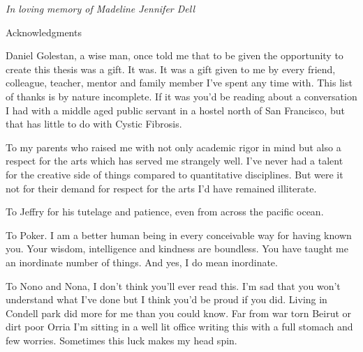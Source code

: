 \newpage


\thispagestyle{empty}


\begin{center}
	\vspace*{\fill}
\textit {In loving memory of Madeline Jennifer Dell} \\
	\vspace*{\fill}
\end{center}

\clearpage

\begin{center}
\begin{Large}
\begin{bfseries}
Acknowledgments
\end{bfseries}
\end{Large}
\end{center}
 Daniel Golestan, a wise man, once told me that to be given the opportunity to create this thesis was a gift. It was. It was a gift given to me by every friend, colleague, teacher, mentor and family member I've spent any time with. This list of thanks is by nature incomplete. If it was you'd be reading about a conversation I had with a middle aged public servant in a hostel north of San Francisco, but that has little to do with Cystic Fibrosis. 

To my parents who raised me with not only academic rigor in mind but also a respect for the arts which has served me strangely well. I've never had a talent for the creative side of things compared to quantitative disciplines. But were it not for their demand for respect for the arts I'd have remained illiterate. 

To Jeffry for his tutelage and patience, even from across the pacific ocean. 

To Poker. I am a better human being in every conceivable way for having known you. Your wisdom, intelligence and kindness are boundless. You have taught me an inordinate number of things. And yes, I do mean inordinate. 

To Nono and Nona, I don't think you'll ever read this. I'm sad that you won't understand what I've done but I think you'd be proud if you did. Living in Condell park did more for me than you could know. Far from war torn Beirut or dirt poor Orria I'm sitting in a well lit office writing this with a full stomach and few worries. Sometimes this luck makes my head spin. 

